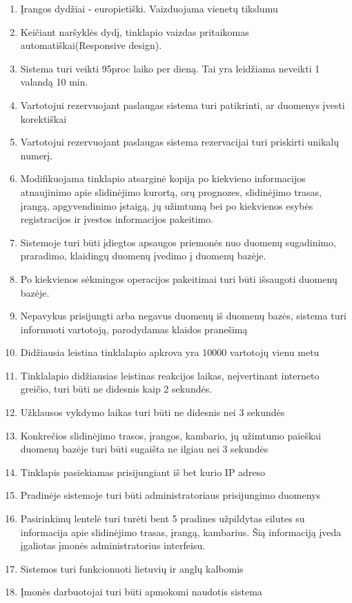 \documentclass[oneside]{VUMIFPSkursinis}
\begin{document}
\begin{enumerate}
	\item Įrangos dydžiai - europietiški. Vaizduojama vienetų tikslumu
	\item Keičiant naršyklės dydį, tinklapio vaizdas pritaikomas automatiškai(Responsive design).
	\item Sistema turi veikti 95proc laiko per dieną. Tai yra leidžiama neveikti 1 valandą 10 min.	
	\item Vartotojui rezervuojant paslaugas sistema turi patikrinti, ar duomenys įvesti korektiškai
	\item Vartotojui rezervuojant paslaugas sistema rezervacijai turi priskirti unikalų numerį.
	\item Modifikuojama tinklapio atsarginė kopija po kiekvieno informacijos atnaujinimo apie slidinėjimo kurortą, orų prognozes, slidinėjimo trasas, įrangą, apgyvendinimo įstaigą, jų užimtumą bei po kiekvienos esybės registracijos ir įvestos informacijos pakeitimo.
	\item Sistemoje turi būti įdiegtos apsaugos priemonės nuo duomenų sugadinimo, praradimo, klaidingų duomenų įvedimo į duomenų bazėje.
	\item Po kiekvienos sėkmingos operacijos pakeitimai turi būti išsaugoti duomenų bazėje.
	\item Nepavykus prisijungti arba negavus duomenų iš duomenų bazės, sistema turi informuoti vartotoją, parodydamas klaidos pranešimą
	\item Didžiausia leistina tinklalapio apkrova yra 10000 vartotojų vienu metu
	\item Tinklalapio didžiausias leistinas reakcijos laikas, neįvertinant interneto greičio, turi būti ne didesnis kaip 2 sekundės.
	\item Užklausos vykdymo laikas turi būti ne didesnis nei 3 sekundės
	\item Konkrečios slidinėjimo trasos, įrangos, kambario, jų užimtumo paieškai duomenų bazėje turi būti sugaišta ne ilgiau nei 3 sekundės
	\item Tinklapis pasiekiamas prisijungiant iš bet kurio IP adreso
	\item Pradinėje sistemoje turi būti administratoriaus prisijungimo duomenys
	\item Pasirinkimų lentelė turi turėti bent 5 pradines užpildytas eilutes su informacija apie slidinėjimo trasas, įrangą, kambarius. Šią informaciją įveda įgaliotas įmonės administratorius interfeisu.
	\item Sistemos turi funkcionuoti lietuvių ir anglų kalbomis
	\item Įmonės darbuotojai turi būti apmokomi naudotis sistema

\end{enumerate}
\end{document}
